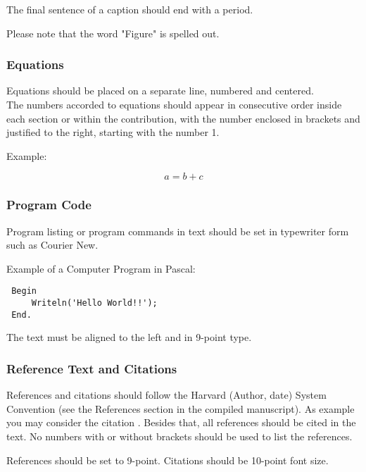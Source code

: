 \documentclass[a4paper,twoside]{article}
\begin{document}
The final sentence of a caption should end with a period.



Please note that the word "Figure" is spelled out.

\subsubsection{Equations}

Equations should be placed on a separate line, numbered and
centered.\\The numbers accorded to equations should appear in
consecutive order inside each section or within the contribution,
with the number enclosed in brackets and justified to the right,
starting with the number 1.

Example:

\begin{equation}\label{eq1}
    a=b+c
\end{equation}

\subsubsection{Program Code}\label{subsubsec:program_code}

Program listing or program commands in text should be set in
typewriter form such as Courier New.

Example of a Computer Program in Pascal:

\begin{small}
\begin{verbatim}
 Begin
     Writeln('Hello World!!');
 End.
\end{verbatim}
\end{small}


The text must be aligned to the left and in 9-point type.

\vfill
\subsubsection{Reference Text and Citations}

References and citations should follow the Harvard (Author, date)
System Convention (see the References section in the compiled
manuscript). As example you may consider the citation
\cite{Smith98}. Besides that, all references should be cited in the
text. No numbers with or without brackets should be used to list the
references.

References should be set to 9-point. Citations should be 10-point
font size.
\end{document}
